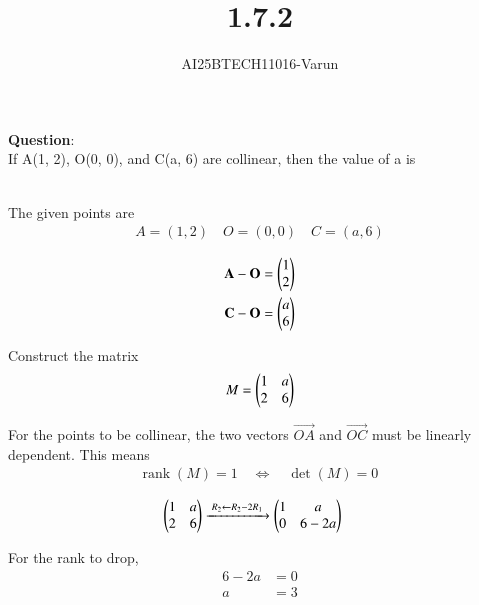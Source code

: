 \documentclass[journal]{IEEEtran}
\begin{document}

\vspace{3cm}

\title{1.7.2}
\author{AI25BTECH11016-Varun}
 \maketitle
{\let\newpage\relax\maketitle}
\renewcommand{\thefigure}{\theenumi}
\renewcommand{\thetable}{\theenumi}
\setlength{\intextsep}{10pt} %

\renewcommand{\thetable}{\theenumi}
\textbf{Question}:\\
If A(1, 2), O(0, 0), and C(a, 6) are collinear, then the value of a is

\solution \\
The given points are
\begin{align}
A = (1,2) \quad O = (0,0) \quad C = (a,6)
\end{align}

\begin{align}    
 \mathbf{A} - \mathbf{O} = \begin{pmatrix}1 \\ 2\end{pmatrix}\\ 
 \mathbf{C} -\mathbf{O} = \begin{pmatrix}a \\ 6\end{pmatrix}
\end{align}


Construct the matrix
\begin{align} 
M = \begin{pmatrix}1 & a \\ 2 & 6\end{pmatrix}
\end{align}

For the points to be collinear, the two vectors $\Vec{OA}$ and $\vec{OC}$ must be linearly dependent.  
This means
\begin{align}
\operatorname{rank}(M) = 1 \quad \Leftrightarrow \quad \det(M) = 0 \
\end{align}


\begin{align}
\myvec{1 & a \\ 2 & 6}
&\xrightarrow{\;R_2 \gets R_2 - 2R_1\;}
\myvec{1 & a \\ 0 & 6 - 2a}

\end{align}


For the rank to drop,
\begin{align}
6 - 2a &= 0 \\
a &= 3
\end{align}
\end{document}
